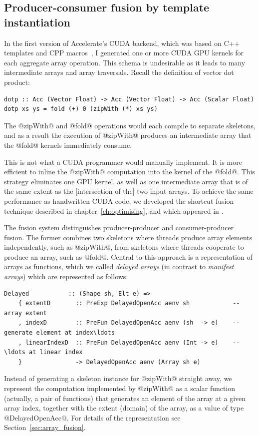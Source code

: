 

\subsection{Producer-consumer fusion by template instantiation}
\label{sec:fusion_by_template_instantiation}

In the first version of Accelerate's CUDA backend, which was based on C++
templates and CPP macros~\cite{Chakravarty:2011fr}, I generated one or more
CUDA GPU kernels for each aggregate array operation. This schema is undesirable
as it leads to many intermediate arrays and array traversals. Recall the
definition of vector dot product:
%
\begin{lstlisting}[style=haskell]
dotp :: Acc (Vector Float) -> Acc (Vector Float) -> Acc (Scalar Float)
dotp xs ys = fold (+) 0 (zipWith (*) xs ys)
\end{lstlisting}
%
The @zipWith@ and @fold@ operations would each compile to separate
skeletons, and as a result the execution of @zipWith@ produces an
intermediate array that the @fold@ kernels immediately consume.

This is not what a CUDA programmer would manually implement. It is more
efficient to inline the @zipWith@ computation into the kernel of the
@fold@. This strategy eliminates one GPU kernel, as well as one
intermediate array that is of the same extent as the [intersection of the] two
input arrays. To achieve the same performance as handwritten CUDA code, we
developed the shortcut fusion technique described in
chapter~\ref{ch:optimising}, and which appeared in \cite{McDonell:2013wi}.

The fusion system distinguishes producer-producer and consumer-producer fusion.
The former combines two skeletons where threads produce array elements
independently, such as @zipWith@, from skeletons where threads cooperate to produce
an array, such as @fold@. Central to this approach is a representation of arrays
as functions, which we called \emph{delayed arrays}\arrs[delayed]{} (in
contrast to \emph{manifest arrays}\arrs[manifest]{}) which are represented
as follows:
%
\begin{lstlisting}[style=haskell]
  Delayed           :: (Shape sh, Elt e) =>
    { extentD       :: PreExp DelayedOpenAcc aenv sh            -- array extent
    , indexD        :: PreFun DelayedOpenAcc aenv (sh  -> e)    -- generate element at index\ldots
    , linearIndexD  :: PreFun DelayedOpenAcc aenv (Int -> e)    -- \ldots at linear index
    }               -> DelayedOpenAcc aenv (Array sh e)
\end{lstlisting}
%
Instead of generating a skeleton\skeleton{} instance for @zipWith@ straight
away, we represent the computation implemented by @zipWith@ as a scalar function
(actually, a pair of functions) that generates an element of the array at a
given array index, together with the extent (domain) of the array, as a value of
type @DelayedOpenAcc@. For details of the representation see
Section~\ref{sec:array_fusion}.

